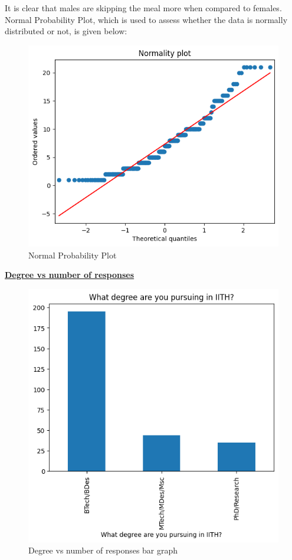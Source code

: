 \documentclass{article}
\begin{document}
It is clear that males are skipping the meal more when compared to females.\\
Normal Probability Plot, which is used to assess whether the data is normally distributed or not, is given below:
\begin{figure}[H]
    \centering
    \includegraphics[scale = 0.8]{normality_plot.png}
    \caption{Normal Probability Plot}  
    \label{fig:Normality_plot}
\end{figure}
\pagebreak
\centerline{\underline{\bfseries{ Degree vs number of responses}}}
\begin{figure}[H]
    \centering
    \includegraphics[scale = 0.7]{bar_degree.png}
    \caption{Degree vs number of responses bar graph}  
    \label{fig:bar_degree}
\end{figure}
\end{document}
